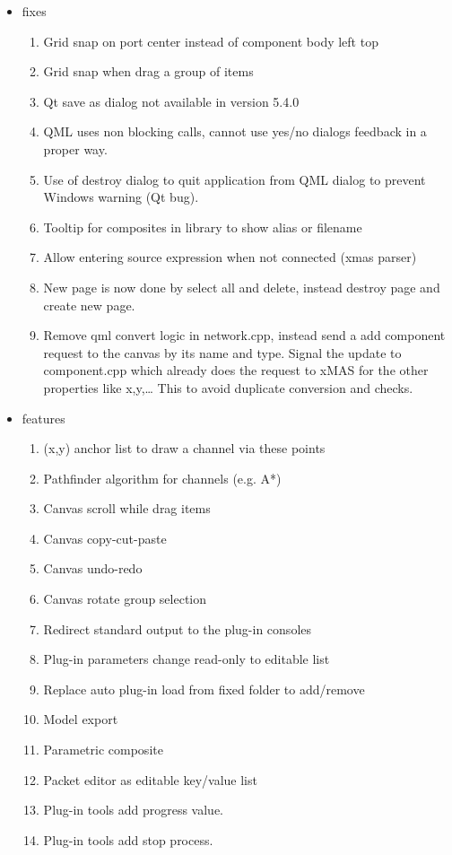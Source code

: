 \begin{itemize}
\item	fixes
\begin{enumerate}
\item	Grid snap on port center instead of component body left top
\item	Grid snap when drag a group of items
\item	Qt save as dialog not available in version 5.4.0
\item QML uses non blocking calls, cannot use yes/no dialogs feedback in a
proper way.
\item Use of destroy dialog to quit application from QML dialog to prevent
Windows warning (Qt bug).
\item	Tooltip for composites in library to show alias or filename
\item Allow entering source expression when not connected (xmas parser)
\item New page is now done by select all and delete, instead destroy page and
create new page.
\item Remove qml convert logic in network.cpp, instead send a add component
request to the canvas by its name and type. Signal the update to component.cpp
which already does the request to xMAS for the other properties like x,y,… This
to avoid duplicate conversion and checks.
\end{enumerate}
\item	features
\begin{enumerate}
\item	(x,y) anchor list to draw a channel via these points
\item	Pathfinder algorithm for channels (e.g. A*)
\item	Canvas scroll while drag items
\item	Canvas copy-cut-paste
\item	Canvas undo-redo
\item	Canvas rotate group selection
\item	Redirect standard output to the plug-in consoles
\item	Plug-in parameters change read-only to editable list
\item	Replace auto plug-in load from fixed folder to add/remove
\item	Model export
\item	Parametric composite
\item	Packet editor as editable key/value list
\item	Plug-in tools add progress value.
\item	Plug-in tools add stop process. 

\end{enumerate}
\end{itemize}
